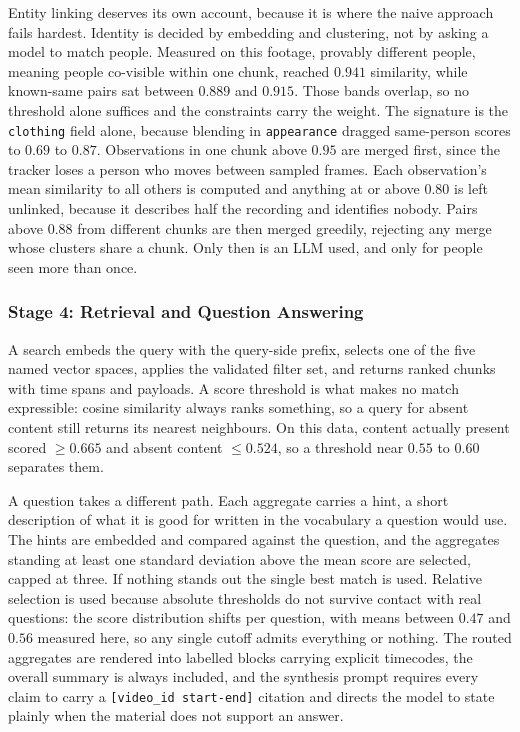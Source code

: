 \documentclass[11pt,a4paper]{article}
\begin{document}
Entity linking deserves its own account, because it is where the naive approach
fails hardest. Identity is decided by embedding and clustering, not by asking a
model to match people. Measured on this footage, provably different people,
meaning people co-visible within one chunk, reached $0.941$ similarity, while
known-same pairs sat between $0.889$ and $0.915$. Those bands overlap, so no
threshold alone suffices and the constraints carry the weight. The signature is
the \texttt{clothing} field alone, because blending in \texttt{appearance}
dragged same-person scores to $0.69$ to $0.87$. Observations in one chunk above
$0.95$ are merged first, since the tracker loses a person who moves between
sampled frames. Each observation's mean similarity to all others is computed and
anything at or above $0.80$ is left unlinked, because it describes half the
recording and identifies nobody. Pairs above $0.88$ from different chunks are
then merged greedily, rejecting any merge whose clusters share a chunk. Only
then is an LLM used, and only for people seen more than once.

\subsubsection*{Stage 4: Retrieval and Question Answering}

A search embeds the query with the query-side prefix, selects one of the five
named vector spaces, applies the validated filter set, and returns ranked chunks
with time spans and payloads. A score threshold is what makes no match
expressible: cosine similarity always ranks something, so a query for absent
content still returns its nearest neighbours. On this data, content actually
present scored $\geq 0.665$ and absent content $\leq 0.524$, so a threshold near
$0.55$ to $0.60$ separates them.

A question takes a different path. Each aggregate carries a hint, a short
description of what it is good for written in the vocabulary a question would
use. The hints are embedded and compared against the question, and the
aggregates standing at least one standard deviation above the mean score are
selected, capped at three. If nothing stands out the single best match is used.
Relative selection is used because absolute thresholds do not survive contact
with real questions: the score distribution shifts per question, with means
between $0.47$ and $0.56$ measured here, so any single cutoff admits everything
or nothing. The routed aggregates are rendered into labelled blocks carrying
explicit timecodes, the overall summary is always included, and the synthesis
prompt requires every claim to carry a \texttt{[video\_id start-end]} citation
and directs the model to state plainly when the material does not support an
answer.
\end{document}
